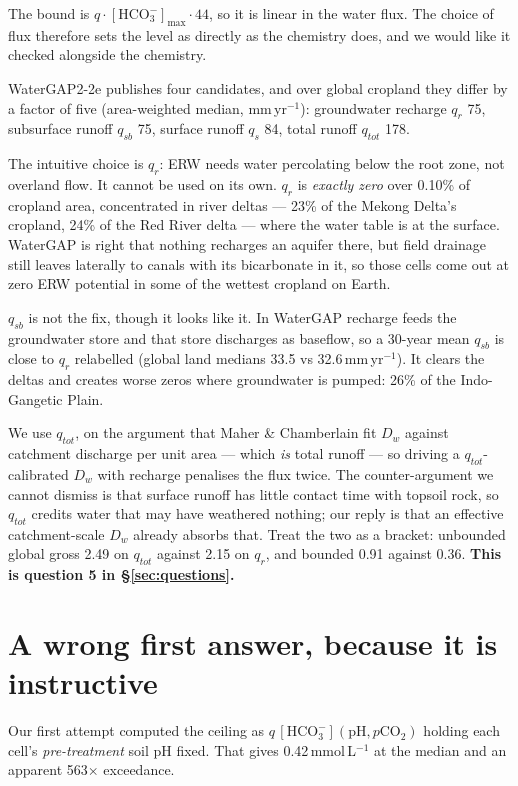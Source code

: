 \documentclass[11pt,a4paper]{article}
\begin{document}
The bound is $q \cdot [\mathrm{HCO_3^-}]_{\max} \cdot 44$, so it is linear in the
water flux. The choice of flux therefore sets the level as directly as the chemistry
does, and we would like it checked alongside the chemistry.

WaterGAP2-2e publishes four candidates, and over global cropland they differ by a
factor of five (area-weighted median, mm\,yr$^{-1}$): groundwater recharge $q_r$
75, subsurface runoff $q_{sb}$ 75, surface runoff $q_s$
84, total runoff $q_{tot}$ 178.

The intuitive choice is $q_r$: ERW needs water percolating below the root zone, not
overland flow. It cannot be used on its own. $q_r$ is \emph{exactly zero} over 0.10\%
of cropland area, concentrated in river deltas --- 23\% of the Mekong Delta's
cropland, 24\% of the Red River delta --- where the water table is at the surface.
WaterGAP is right that nothing recharges an aquifer there, but field drainage still
leaves laterally to canals with its bicarbonate in it, so those cells come out at
zero ERW potential in some of the wettest cropland on Earth.

$q_{sb}$ is not the fix, though it looks like it. In WaterGAP recharge feeds the
groundwater store and that store discharges as baseflow, so a 30-year mean $q_{sb}$
is close to $q_r$ relabelled (global land medians 33.5 vs 32.6\,mm\,yr$^{-1}$). It
clears the deltas and creates worse zeros where groundwater is pumped: 26\% of the
Indo-Gangetic Plain.

We use $q_{tot}$, on the argument that Maher \& Chamberlain fit $D_w$ against
catchment discharge per unit area --- which \emph{is} total runoff --- so driving a
$q_{tot}$-calibrated $D_w$ with recharge penalises the flux twice. The
counter-argument we cannot dismiss is that surface runoff has little contact time
with topsoil rock, so $q_{tot}$ credits water that may have weathered nothing; our
reply is that an effective catchment-scale $D_w$ already absorbs that. Treat the two
as a bracket: unbounded global gross 2.49 on $q_{tot}$ against 2.15 on $q_r$,
and bounded 0.91 against 0.36. \textbf{This is question 5 in
\S\ref{sec:questions}.}

\section{A wrong first answer, because it is instructive}

Our first attempt computed the ceiling as $q\,[\mathrm{HCO_3^-}](\mathrm{pH},
p\mathrm{CO_2})$ holding each cell's \emph{pre-treatment} soil pH fixed. That gives
0.42\,mmol\,L$^{-1}$ at the median and an apparent 563$\times$ exceedance.
\end{document}
